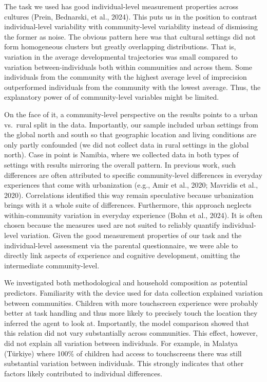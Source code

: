 \documentclass[
  man,floatsintext]{apa7}
\begin{document}
The task we used has good individual-level measurement properties across cultures (Prein, Bednarski, et al., 2024). This puts us in the position to contrast individual-level variability with community-level variability instead of dismissing the former as noise. The obvious pattern here was that cultural settings did not form homogeneous clusters but greatly overlapping distributions. That is, variation in the average developmental trajectories was small compared to variation between-individuals both within communities and across them. Some individuals from the community with the highest average level of imprecision outperformed individuals from the community with the lowest average. Thus, the explanatory power of of community-level variables might be limited.

On the face of it, a community-level perspective on the results points to a urban vs.~rural split in the data. Importantly, our sample included urban settings from the global north and south so that geographic location and living conditions are only partly confounded (we did not collect data in rural settings in the global north). Case in point is Namibia, where we collected data in both types of settings with results mirroring the overall pattern. In previous work, such differences are often attributed to specific community-level differences in everyday experiences that come with urbanization (e.g., Amir et al., 2020; Mavridis et al., 2020). Correlations identified this way remain speculative because urbanization brings with it a whole suite of differences. Furthermore, this approach neglects within-community variation in everyday experience (Bohn et al., 2024). It is often chosen because the measures used are not suited to reliably quantify individual-level variation. Given the good measurement properties of our task and the individual-level assessment via the parental questionnaire, we were able to directly link aspects of experience and cognitive development, omitting the intermediate community-level.

We investigated both methodological and household composition as potential predictors. Familiarity with the device used for data collection explained variation between communities. Children with more touchscreen experience were probably better at task handling and thus more likely to precisely touch the location they inferred the agent to look at. Importantly, the model comparison showed that this relation did not vary substantially across communities. This effect, however, did not explain all variation between individuals. For example, in Malatya (Türkiye) where 100\% of children had access to touchscreens there was still substantial variation between individuals. This strongly indicates that other factors likely contributed to individual differences.
\end{document}
